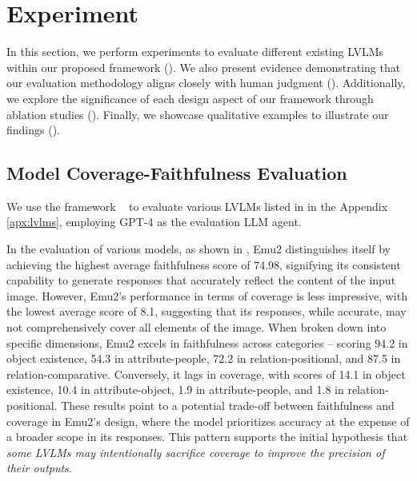 \section{Experiment}

In this section, we perform experiments to evaluate different existing LVLMs within our proposed framework (). We also present evidence demonstrating that our evaluation methodology aligns closely with human judgment (). Additionally, we explore the significance of each design aspect of our framework through ablation studies (). Finally, we showcase qualitative examples to illustrate our findings ().

\subsection{Model Coverage-Faithfulness Evaluation}
\label{subsec:exp_eval}
We use the framework \eval~ to evaluate various LVLMs listed in  in the Appendix \ref{apx:lvlms}, employing GPT-4 as the evaluation LLM agent. 

In the evaluation of various models, as shown in , Emu2 distinguishes itself by achieving the highest average faithfulness score of 74.98, signifying its consistent capability to generate responses that accurately reflect the content of the input image. However, Emu2's performance in terms of coverage is less impressive, with the lowest average score of 8.1, suggesting that its responses, while accurate, may not comprehensively cover all elements of the image. When broken down into specific dimensions, Emu2 excels in faithfulness across categories -- scoring 94.2 in object existence, 54.3 in attribute-people, 72.2 in relation-positional, and 87.5 in relation-comparative. Conversely, it lags in coverage, with scores of 14.1 in object existence, 10.4 in attribute-object, 1.9 in attribute-people, and 1.8 in relation-positional. These results point to a potential trade-off between faithfulness and coverage in Emu2's design, where the model prioritizes accuracy at the expense of a broader scope in its responses. This pattern supports the initial hypothesis that \textit{some LVLMs may intentionally sacrifice coverage to improve the precision of their outputs}.

